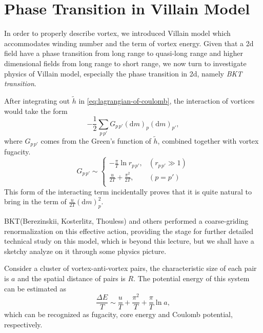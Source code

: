 
\section{Phase Transition in Villain Model}
In order to properly describe vortex, we introduced Villain model which accommodates winding number and the term of vortex energy. Given that a 2d field have a phase transition from long range to quasi-long range and higher dimensional fields from long range to short range, we now turn to investigate physics of Villain model, especially the phase transition in 2d, namely \emph{BKT transition}.

After integrating out $\tilde{h}$ in \eqref{eq:lagrangian-of-coulomb}, the interaction of vortices would take the form
\begin{equation}
  - \frac{1}{2} \sum_{p \, p'} G_{p\, p'} \left( \mathrm{d} m \right)_{p} \left( \mathrm{d} m \right)_{p'},
\end{equation}
where $G_{p\, p'}$ comes from the Green's function of $\tilde{h}$, combined together with vortex fugacity.
\begin{equation}
  G_{p\, p'} \sim 
  \begin{cases}
    - \frac{\pi}{T} \ln r_{p\, p'} , & \left( r_{p\, p'} \gg 1 \right)\\
    \frac{u}{2T} + \frac{\pi ^{2}}{2T} , & \left( p=p' \right) \\
  \end{cases}
\end{equation}
This form of the interacting term incidentally proves that it is quite natural to bring in the term of $\frac{u}{2T} \left( \mathrm{d} m \right)_{p}^{2}$.

BKT(Berezinskii, Kosterlitz, Thouless) and others performed a coarse-griding renormalization on this effective action, providing the stage for further detailed technical study on this model, which is beyond this lecture, but we shall have a sketchy analyze on it through some physics picture.

Consider a cluster of vortex-anti-vortex pairs, the characteristic size of each pair is $a$ and the spatial distance of pairs is $R$. The potential energy of this system can be estimated as
\begin{equation}
  \frac{\Delta E}{T} \sim \frac{u}{T} + \frac{\pi ^{2}}{T} + \frac{\pi}{T} \ln a,
\end{equation}
which can be recognized as fugacity, core energy and Coulomb potential, respectively.

